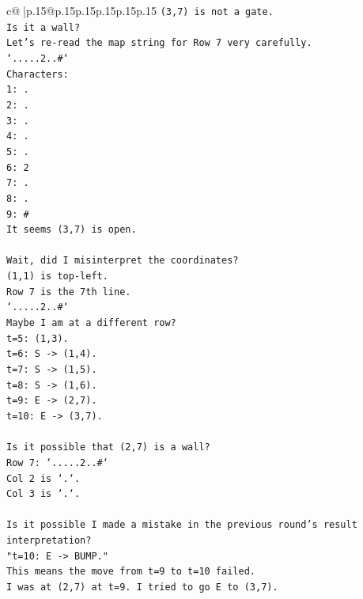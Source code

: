 \documentclass{article}
\begin{document}
{\begin{supertabular}{c@{$\;$}|p{.15\linewidth}@{}p{.15\linewidth}p{.15\linewidth}p{.15\linewidth}p{.15\linewidth}p{.15\linewidth}}
{{{\texttt{(3,7) is not a gate.} \\
\texttt{Is it a wall?} \\
\texttt{Let's re{-}read the map string for Row 7 very carefully.} \\
\texttt{`.....2..\#`} \\
\texttt{Characters:} \\
\texttt{1: .} \\
\texttt{2: .} \\
\texttt{3: .} \\
\texttt{4: .} \\
\texttt{5: .} \\
\texttt{6: 2} \\
\texttt{7: .} \\
\texttt{8: .} \\
\texttt{9: \#} \\
\texttt{It seems (3,7) is open.} \\
\\ 
\texttt{Wait, did I misinterpret the coordinates?} \\
\texttt{(1,1) is top{-}left.} \\
\texttt{Row 7 is the 7th line.} \\
\texttt{`.....2..\#`} \\
\texttt{Maybe I am at a different row?} \\
\texttt{t=5: (1,3).} \\
\texttt{t=6: S {-}> (1,4).} \\
\texttt{t=7: S {-}> (1,5).} \\
\texttt{t=8: S {-}> (1,6).} \\
\texttt{t=9: E {-}> (2,7).} \\
\texttt{t=10: E {-}> (3,7).} \\
\\ 
\texttt{Is it possible that (2,7) is a wall?} \\
\texttt{Row 7: `.....2..\#`} \\
\texttt{Col 2 is `.`.} \\
\texttt{Col 3 is `.`.} \\
\\ 
\texttt{Is it possible I made a mistake in the previous round's result interpretation?} \\
\texttt{"t=10: E {-}> BUMP."} \\
\texttt{This means the move from t=9 to t=10 failed.} \\
\texttt{I was at (2,7) at t=9. I tried to go E to (3,7).} \\
}}}
\end{supertabular}}
\end{document}
